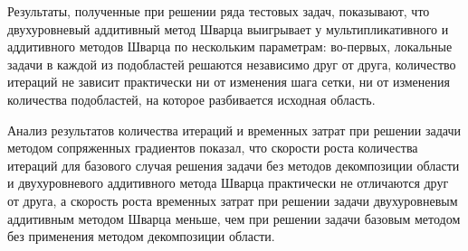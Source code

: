 \documentclass[a4paper, 14pt]{extarticle}
\begin{document}
Результаты, полученные при решении ряда тестовых задач, показывают, что двухуровневый аддитивный метод Шварца выигрывает у мультипликативного и аддитивного методов Шварца по нескольким параметрам: во-первых, локальные задачи в каждой из подобластей решаются независимо друг от друга, количество итераций не зависит практически ни от изменения шага сетки, ни от изменения количества подобластей, на которое разбивается исходная область.

Анализ результатов количества итераций и временных затрат при решении задачи методом сопряженных градиентов показал, что скорости роста количества итераций для базового случая решения задачи без методов декомпозиции области и двухуровневого аддитивного метода Шварца практически не отличаются друг от друга, а скорость роста временных затрат при решении задачи двухуровневым аддитивным методом Шварца меньше, чем при решении задачи базовым методом без применения методом декомпозиции области.

\renewcommand{\refname}{\centering\textbf\selectfont\large СПИСОК ИСПОЛЬЗОВАННЫХ ИСТОЧНИКОВ} 
\newpage

\makeatletter
\def\@biblabel#1{#1. }
\makeatother
\end{document}
